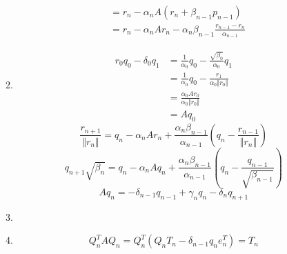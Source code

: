 \documentclass{article}
\numberwithin{equation}{section}
\begin{document}
\begin{enumerate}[label=(\alph*)]
\begin{enumerate}[label=\roman*]
\begin{align*}
                & = r_n - \alpha_n A (r_n + \beta_{n-1}p_{n-1})\\
                & = r_n - \alpha_n A r_n - \alpha_n\beta_{n-1}\frac{r_{n-1}-r_n}{\alpha_{n-1}}
            \end{align*}
            \item \begin{align*}
                r_0q_0 - \delta_0q_1
                & = \frac{1}{\alpha_0}q_0 - \frac{\sqrt{\beta_0}}{\alpha_0}q_1\\
                & = \frac{1}{\alpha_0}q_0 - \frac{r_1}{\alpha_0\Vert r_0 \Vert}\\
                & = \frac{\alpha_0Ar_0}{\alpha_0 \Vert r_0 \Vert}\\
                & = Aq_0
            \end{align*}
            $$\frac{r_{n+1}}{\Vert r_n\Vert} = q_n - \alpha_n A r_n +\frac{\alpha_n \beta_{n-1}}{\alpha_{n-1}}\left(q_n-\frac{r_{n-1}}{\Vert r_n\Vert}\right)$$
            $$q_{n+1}\sqrt{\beta_n} = q_n -\alpha_n A q_n + \frac{\alpha_n \beta_{n-1}}{\alpha_{n-1}}\left(q_n - \frac{q_{n-1}}{\sqrt{\beta_{n-1}}}\right)$$
            $$Aq_n = -\delta_{n-1}q_{n-1}+\gamma_n q_n - \delta_n q_{n+1}$$
            \item 
            \item $$Q_n^TAQ_n = Q_n^T(Q_nT_n-\delta_{n-1}q_ne_n^T) = T_n$$
        \end{enumerate}
    \end{enumerate}
\end{document}
